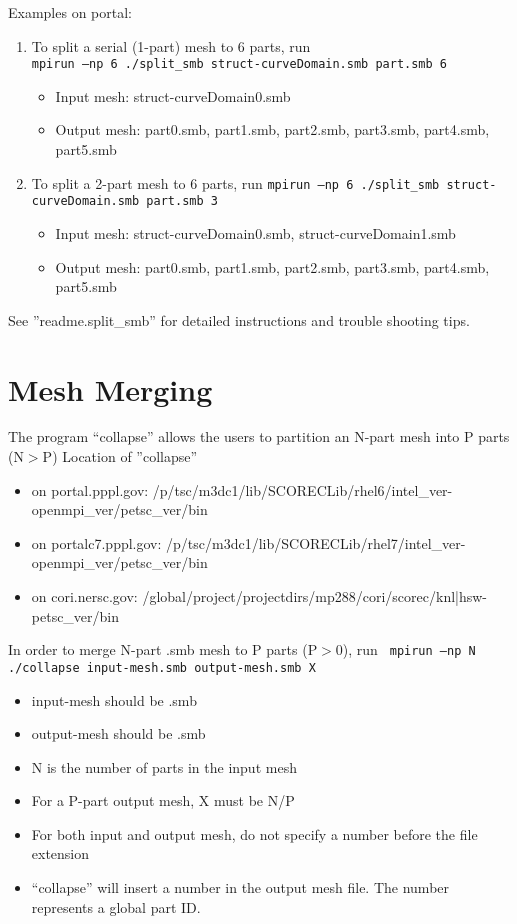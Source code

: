 Examples on portal:
\begin{enumerate}
\item To split a serial (1-part) mesh to 6 parts, run\\
 \texttt{mpirun –np 6 ./split\_smb struct-curveDomain.smb part.smb 6}
\begin{itemize}
\item	Input mesh: struct-curveDomain0.smb 
\item	Output mesh: part0.smb, part1.smb, part2.smb, part3.smb, part4.smb, part5.smb
\end{itemize}

\item To split a 2-part mesh to 6 parts, run
 \texttt{mpirun –np 6 ./split\_smb  struct-curveDomain.smb part.smb 3}
\begin{itemize}
\item	Input mesh: struct-curveDomain0.smb, struct-curveDomain1.smb
\item	Output mesh: part0.smb, part1.smb, part2.smb, part3.smb, part4.smb, part5.smb
\end{itemize}
\end{enumerate}

See ”readme.split\_smb” for detailed instructions and trouble shooting tips.


\section{Mesh Merging}

The program “collapse” allows the users to partition an N-part mesh into P parts (N$>$P)
\newline\newline
Location of ”collapse”
\begin{itemize}
\item	on portal.pppl.gov: \newline
/p/tsc/m3dc1/lib/SCORECLib/rhel6/intel\_ver-openmpi\_ver/petsc\_ver/bin
\item	on portalc7.pppl.gov: \newline
/p/tsc/m3dc1/lib/SCORECLib/rhel7/intel\_ver-openmpi\_ver/petsc\_ver/bin
\item	on cori.nersc.gov: \newline
 /global/project/projectdirs/mp288/cori/scorec/knl|hsw-petsc\_ver/bin
\end{itemize}

In order to merge N-part .smb mesh to P parts (P$>$0), run
\texttt{
	mpirun –np N ./collapse input-mesh.smb output-mesh.smb X 
}
\begin{itemize}
\item	input-mesh should be .smb 
\item	output-mesh should be .smb
\item	N is the number of parts in the input mesh
\item	For a P-part output mesh, X must be N/P
\item	For both input and output mesh, do not specify a number before the file extension
\item	“collapse” will insert a number in the output mesh file. The number represents a global part ID.
\end{itemize}

